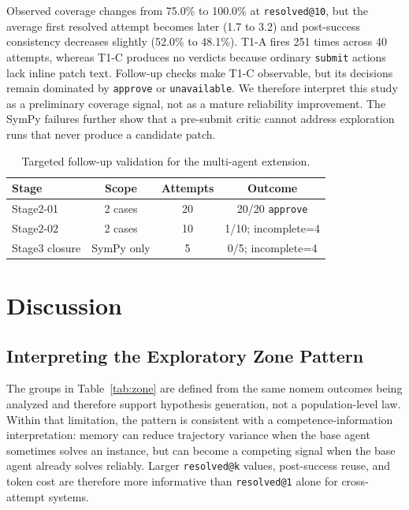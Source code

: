 \documentclass[runningheads]{llncs}
\begin{document}
Observed coverage changes from 75.0\% to 100.0\% at \texttt{resolved@10}, but the average first resolved attempt becomes later (1.7 to 3.2) and post-success consistency decreases slightly (52.0\% to 48.1\%). T1-A fires 251 times across 40 attempts, whereas T1-C produces no verdicts because ordinary \texttt{submit} actions lack inline patch text. Follow-up checks make T1-C observable, but its decisions remain dominated by \texttt{approve} or \texttt{unavailable}. We therefore interpret this study as a preliminary coverage signal, not as a mature reliability improvement. The SymPy failures further show that a pre-submit critic cannot address exploration runs that never produce a candidate patch.

\begin{table}[h]
\centering
\caption{Targeted follow-up validation for the multi-agent extension.}
\label{tab:multiagent_followup}
\small
\begin{tabular}{lccc}
\toprule
\textbf{Stage} & \textbf{Scope} & \textbf{Attempts} & \textbf{Outcome} \\
\midrule
Stage2-01 & 2 cases & 20 & 20/20 \texttt{approve} \\
Stage2-02 & 2 cases & 10 & 1/10; incomplete=4 \\
Stage3 closure & SymPy only & 5 & 0/5; incomplete=4 \\
\bottomrule
\end{tabular}
\end{table}

\section{Discussion}

\subsection{Interpreting the Exploratory Zone Pattern}
\label{sec:unlock}

The groups in Table~\ref{tab:zone} are defined from the same nomem outcomes being analyzed and therefore support hypothesis generation, not a population-level law. Within that limitation, the pattern is consistent with a competence-information interpretation: memory can reduce trajectory variance when the base agent sometimes solves an instance, but can become a competing signal when the base agent already solves reliably. Larger \texttt{resolved@k} values, post-success reuse, and token cost are therefore more informative than \texttt{resolved@1} alone for cross-attempt systems.
\end{document}
